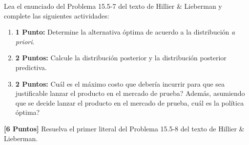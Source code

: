 \documentclass[ a4paper, twoside, 11pt]{article}
\begin{document}
\begin{problem}
\label{prob:H&L_P15_5_7} Lea el enunciado del Problema 15.5-7 del texto de Hillier \& Lieberman y complete las siguientes actividades: 
\begin{enumerate}[label=\textbf{\alph*)}]
\item \textbf{1 Punto:} Determine la alternativa \'optima de acuerdo a la distribuci\'on \emph{a priori}. 
\item \textbf{2 Puntos:} Calcule la distribuci\'on posterior y la distribuci\'on posterior predictiva. 
\item \textbf{2 Puntos:} Cu\'al es el m\'aximo costo que deber\'ia incurrir para que sea justificable lanzar el producto en el mercado de prueba? Adem\'as, asumiendo que se decide lanzar el producto en el mercado de prueba, cu\'al es la pol\'itica \'optima?
\end{enumerate}

\end{problem}
\fullskip

\begin{problem}
\label{prob:H&L_P15_5_8}
\textbf{[6 Puntos]} Resuelva el primer literal del Problema 15.5-8 del texto de Hillier \& Lieberman. 

\end{problem}
\fullskip
\end{document}
